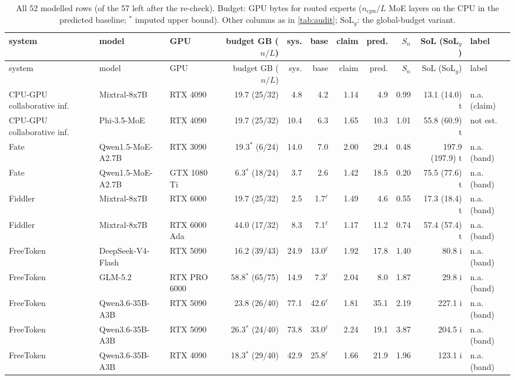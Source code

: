 {\scriptsize\setlength\tabcolsep{2.6pt}
\begin{longtable}{p{2.2cm}p{2.1cm}p{1.5cm}rrrrrrrl}
\caption{All 52 modelled rows (of the 57 left after the re-check). Budget: GPU bytes for routed experts ($n_{\mathrm{cpu}}/L$ MoE layers on the CPU in the predicted baseline; $^\ast$ imputed upper bound). Other columns as in \cref{tab:audit}; SoL$_g$: the global-budget variant.}\label{tab:auditfull}\\
\toprule system & model & GPU & budget GB ($n/L$) & sys. & base & claim & pred. & $S_n$ & SoL (SoL$_g$) & label \\ \midrule\endfirsthead
\toprule system & model & GPU & budget GB ($n/L$) & sys. & base & claim & pred. & $S_n$ & SoL (SoL$_g$) & label \\ \midrule\endhead
\bottomrule\endfoot
CPU-GPU collaborative inf. & Mixtral-8x7B & RTX 4090 & 19.7 (25/32) & 4.8 & 4.2 & 1.14 & 4.9 & 0.99 & 13.1 (14.0) t & n.a. (claim) \\
CPU-GPU collaborative inf. & Phi-3.5-MoE & RTX 4090 & 19.7 (25/32) & 10.4 & 6.3 & 1.65 & 10.3 & 1.01 & 55.8 (60.9) t & not est. \\
Fate & Qwen1.5-MoE-A2.7B & RTX 3090 & 19.3$^\ast$ (6/24) & 14.0 & 7.0 & 2.00 & 29.4 & 0.48 & 197.9 (197.9) t & n.a. (band) \\
Fate & Qwen1.5-MoE-A2.7B & GTX 1080 Ti & 6.3$^\ast$ (18/24) & 3.7 & 2.6 & 1.42 & 18.5 & 0.20 & 75.5 (77.6) t & n.a. (band) \\
Fiddler & Mixtral-8x7B & RTX 6000 & 19.7 (25/32) & 2.5 & 1.7$^\ell$ & 1.49 & 4.6 & 0.55 & 17.3 (18.4) t & n.a. (band) \\
Fiddler & Mixtral-8x7B & RTX 6000 Ada & 44.0 (17/32) & 8.3 & 7.1$^\ell$ & 1.17 & 11.2 & 0.74 & 57.4 (57.4) t & n.a. (band) \\
FreeToken & DeepSeek-V4-Flash & RTX 5090 & 16.2 (39/43) & 24.9 & 13.0$^\ell$ & 1.92 & 17.8 & 1.40 & 80.8 i & n.a. (band) \\
FreeToken & GLM-5.2 & RTX PRO 6000 & 58.8$^\ast$ (65/75) & 14.9 & 7.3$^\ell$ & 2.04 & 8.0 & 1.87 & 29.8 i & n.a. (band) \\
FreeToken & Qwen3.6-35B-A3B & RTX 5090 & 23.8 (26/40) & 77.1 & 42.6$^\ell$ & 1.81 & 35.1 & 2.19 & 227.1 i & n.a. (band) \\
FreeToken & Qwen3.6-35B-A3B & RTX 5090 & 26.3$^\ast$ (24/40) & 73.8 & 33.0$^\ell$ & 2.24 & 19.1 & 3.87 & 204.5 i & n.a. (band) \\
FreeToken & Qwen3.6-35B-A3B & RTX 4090 & 18.3$^\ast$ (29/40) & 42.9 & 25.8$^\ell$ & 1.66 & 21.9 & 1.96 & 123.1 i & n.a. (band) \\

\end{longtable}}
